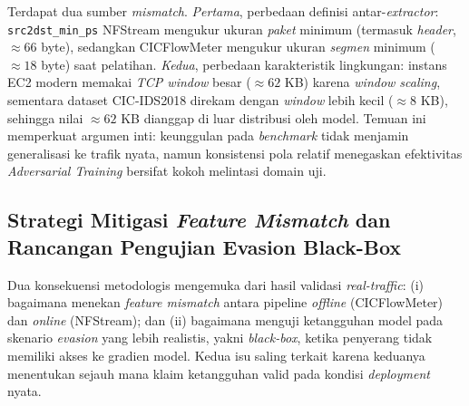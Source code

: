 \documentclass[10pt,twocolumn,a4paper]{extarticle}
\begin{document}
Terdapat dua sumber \textit{mismatch}. \textit{Pertama}, perbedaan definisi antar-\textit{extractor}: \texttt{src2dst\_min\_ps} NFStream mengukur ukuran \textit{paket} minimum (termasuk \textit{header}, $\approx 66$ byte), sedangkan CICFlowMeter mengukur ukuran \textit{segmen} minimum ($\approx 18$ byte) saat pelatihan. \textit{Kedua}, perbedaan karakteristik lingkungan: instans EC2 modern memakai \textit{TCP window} besar ($\approx 62$ KB) karena \textit{window scaling}, sementara dataset CIC-IDS2018 direkam dengan \textit{window} lebih kecil ($\approx 8$ KB), sehingga nilai $\approx 62$ KB dianggap di luar distribusi oleh model. Temuan ini memperkuat argumen inti: keunggulan pada \textit{benchmark} tidak menjamin generalisasi ke trafik nyata, namun konsistensi pola relatif menegaskan efektivitas \textit{Adversarial Training} bersifat kokoh melintasi domain uji.

\subsection{Strategi Mitigasi \textit{Feature Mismatch} dan Rancangan Pengujian Evasion Black-Box}
\label{sec:mitigasi_blackbox}
Dua konsekuensi metodologis mengemuka dari hasil validasi \textit{real-traffic}: (i) bagaimana menekan \textit{feature mismatch} antara pipeline \textit{offline} (CICFlowMeter) dan \textit{online} (NFStream); dan (ii) bagaimana menguji ketangguhan model pada skenario \textit{evasion} yang lebih realistis, yakni \textit{black-box}, ketika penyerang tidak memiliki akses ke gradien model. Kedua isu saling terkait karena keduanya menentukan sejauh mana klaim ketangguhan valid pada kondisi \textit{deployment} nyata.
\end{document}
